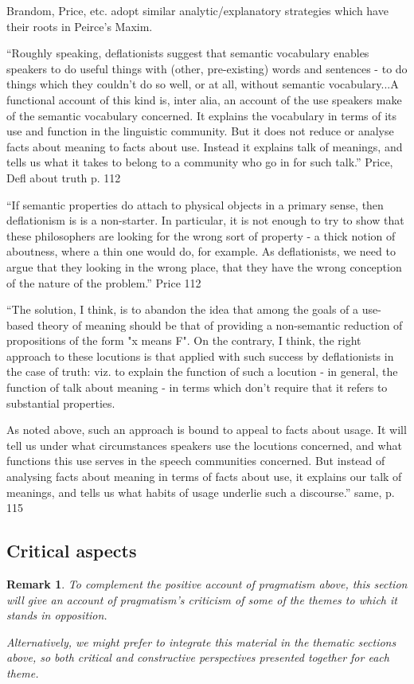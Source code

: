 \documentclass[11pt,twoside]{article}
\newtheorem{remark}{Remark}
\begin{document}
Brandom, Price, etc. adopt similar analytic/explanatory strategies which have
their roots in Peirce's Maxim.

``Roughly speaking, deflationists suggest that semantic vocabulary enables speakers to do useful things with (other, pre-existing) words and sentences - to do things which they couldn't do so well, or at all, without semantic vocabulary...A functional account of this kind is, inter alia, an account of the use speakers make of the semantic vocabulary concerned. It explains the vocabulary in terms of its use and function in the linguistic community. But it does not reduce or analyse facts about meaning to facts about use. Instead it explains talk of meanings, and tells us what it takes to belong to a community who go in for such talk.'' Price, Defl about truth p. 112

``If semantic properties do attach to physical objects in a primary sense, then deflationism is is a non-starter. In particular, it is not enough to try to show that these philosophers are looking for the wrong sort of property - a thick notion of aboutness, where a thin one would do, for example. As deflationists, we need to argue that they looking in the wrong place, that they have the wrong conception of the nature of the problem.'' Price 112

``The solution, I think, is to abandon the idea that among the goals of a use-based theory of meaning should be that of providing a non-semantic reduction of propositions of the form "x means F". On the contrary, I think, the right approach to these locutions is that applied with such success by deflationists in the case of truth: viz. to explain the function of such a locution - in general, the function of talk about meaning - in terms which don't require that it refers to substantial properties.

As noted above, such an approach is bound to appeal to facts about usage. It will tell us under what circumstances speakers use the locutions concerned, and what functions this use serves in the speech communities concerned. But instead of analysing facts about meaning in terms of facts about use, it explains our talk of meanings, and tells us what habits of usage underlie such a discourse.'' same, p. 115

\subsection{Critical aspects}

\begin{remark}
To complement the positive account of pragmatism above, this section
will give an account of pragmatism's criticism of some of the themes
to which it stands in opposition.

Alternatively, we might prefer to integrate this material in the
thematic sections above, so both critical and constructive
perspectives presented together for each theme.
\end{remark}
\end{document}
